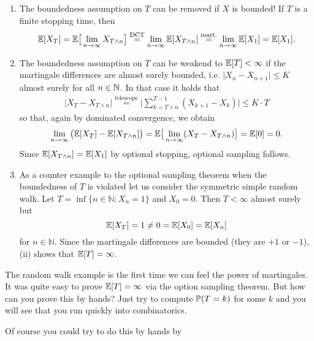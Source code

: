 \begin{remark}
	\begin{enumerate}[label=(\roman*)]
		\item
		The boundedness assumption on $T$ can be removed if $X$ is bounded! If $T$ is a finite stopping time, then $$\E[X_T] = \E\big[ \lim\limits_{n \to \infty} X_{T\wedge n}\big] \overset{\text{DCT}}{=} \lim\limits_{n \to \infty}\E[X_{T\wedge n}] \overset{\text{mart.}}{=} \lim\limits_{n \to \infty} \E[X_1] = \E[X_1].$$
		\item
		The boundedness assumption on $T$ can be weakend to $\E[T] < \infty$ if the martingale differences are almost surely bounded, i.e. $\lvert X_n - X_{n+1}\rvert \leq K$ almost surely for all $n\in\N$. In that case it holds that 
		\begin{align*}
			\lvert X_T- X_{T \wedge n}  \rvert \overset{\text{telescope}}= \Big| \sum\limits_{k=T\wedge n }^{T-1} (X_{k+1}-X_k)\Big| \leq K\cdot T
		\end{align*}
		so that, again by dominated convergence, we obtain
		$$\lim\limits_{n \to \infty}\big(\E[X_{T}]-\E[X_{T\wedge n}]\big) =  \E\big[\lim\limits_{n \to \infty}(X_{T}-X_{T\wedge n})\big] = \E[0] = 0.$$ 
		Since $\E[X_{T\wedge n}]=\E[X_1] $ by optional stopping, optional sampling follows.
				\item As a counter example to the optional sampling theorem when the boundedness of $T$ is violated let us consider the symmetric simple random walk. Let $T = \inf\{n\in\mathbb{N}\colon X_n=1\}$ and $X_0=0$. Then $T<\infty$ almost surely but $$\E[X_T] = 1 \neq 0 = \E[X_0] = \E[X_n]$$ for $n\in \mathbb{N}$. Since the martingale differences are bounded (they are $+1$ or $-1$), (ii) shows that $\E[T]=\infty$.

	\end{enumerate}
\end{remark}
The random walk example is the first time we can feel the power of martingales. It was quite easy to prove $\E[T]=\infty$ via the option sampling theorem. But how can you prove this by hands? Just try to compute $\P(T=k)$ for some $k$ and you will see that you run quickly into combinatorics.


 Of course you could try to do this by hands by 

